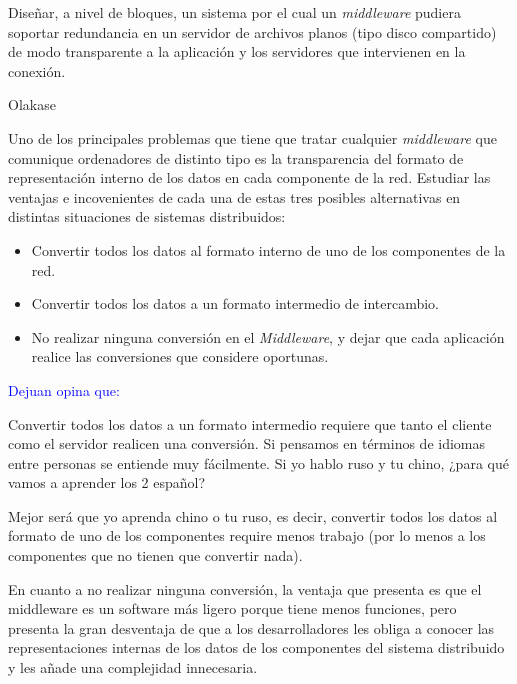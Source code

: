 
  \begin{problem}[1]
  Diseñar, a nivel de bloques, un sistema por el cual un \textit{middleware} pudiera soportar redundancia en un servidor de archivos planos (tipo disco
  compartido) de modo transparente a la aplicación y los servidores
  que intervienen en la conexión.
  

  \solution

  Olakase

  \end{problem}

  \begin{problem}[2]
  Uno de los principales problemas que tiene que tratar cualquier
\textit{middleware} que comunique ordenadores de distinto tipo es la transparencia del formato
  de representación interno de los datos en cada componente de la
  red. Estudiar las ventajas e incovenientes de cada una de estas tres posibles
  alternativas en distintas situaciones de sistemas distribuidos:
    \begin{itemize}
    \item Convertir todos los datos al formato interno de uno de los componentes
    de la red.
    \item Convertir todos los datos a un formato intermedio de intercambio.
    \item No realizar ninguna conversión en el \textit{Middleware}, y dejar que cada
aplicación realice las conversiones que considere oportunas.
\end{itemize}
    \solution
\textcolor{blue}{Dejuan opina que:}

Convertir todos los datos a un formato intermedio requiere que tanto el cliente como el servidor realicen una conversión. Si pensamos en términos de idiomas entre personas se entiende muy fácilmente. Si yo hablo ruso y tu chino, ¿para qué vamos a aprender los 2 español? 

Mejor será que yo aprenda chino o tu ruso, es decir, convertir todos los datos al formato de uno de los componentes require menos trabajo (por lo menos a los componentes que no tienen que convertir nada).

En cuanto a no realizar ninguna conversión, la ventaja que presenta es que el middleware es un software más ligero porque tiene menos funciones, pero presenta la gran desventaja de que a los desarrolladores les obliga a conocer las representaciones internas de los datos de los componentes del sistema distribuido y les añade una complejidad innecesaria.

    \end{problem}


